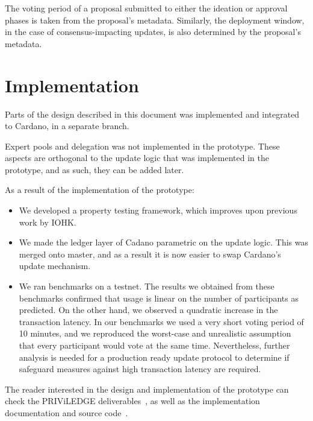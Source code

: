 \documentclass[11pt,a4paper]{article}
\begin{document}
The voting period of a proposal submitted to either the ideation or approval
phases is taken from the proposal's metadata.
Similarly, the deployment window, in the case of consensus-impacting updates, is
also determined by the proposal's metadata.

\section{Implementation}
\label{sec:implementation-1}

Parts of the design described in this document was implemented and integrated to Cardano,
in a separate branch.

Expert pools and delegation was not implemented in the prototype. These aspects
are orthogonal to the update logic that was implemented in the prototype, and as
such, they can be added later.

As a result of the implementation of the prototype:
\begin{itemize}
\item We developed a property testing framework, which improves upon previous
  work by IOHK.
\item We made the ledger layer of Cadano parametric on the update logic. This
  was merged onto master, and as a result it is now easier to swap Cardano's
  update mechanism.
\item We ran benchmarks on a testnet. The results we obtained from these
  benchmarks confirmed that usage is linear on the number of participants as
  predicted. On the other hand, we observed a quadratic increase in the
  transaction latency. In our benchmarks we used a very short voting period of
  10 minutes, and we reproduced the worst-case and unrealistic assumption that
  every participant would vote at the same time. Nevertheless, further analysis
  is needed for a production ready update protocol to determine if safeguard
  measures against high transaction latency are required.
\end{itemize}

The reader interested in the design and implementation of the prototype can
check the PRIViLEDGE deliverables~\cite{priviledge_d11, priviledge_d12,
  priviledge_d41}, as well as the implementation documentation and source
code~\cite{dsu-repo2021}.
\end{document}
